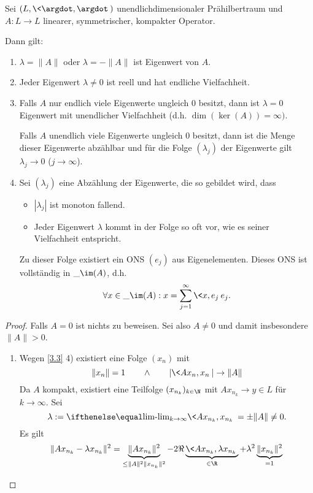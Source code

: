 \begin{st} \label{3.5}
	Sei $(L, \<\argdot,\argdot\>)$ unendlichdimensionaler Prähilbertraum und $A: L \to L$ linearer, symmetrischer, kompakter Operator.

	Dann gilt:
	\begin{enumerate}[1)]
		\item
			$\lambda = \|A \|$ oder $\lambda = - \|A\|$ ist Eigenwert von $A$.
		\item
			Jeder Eigenwert $\lambda \neq 0$ ist reell und hat endliche Vielfachheit.
		\item
			Falls $A$ nur endlich viele Eigenwerte ungleich $0$ besitzt, dann ist $\lambda = 0$ Eigenwert mit unendlicher Vielfachheit (d.h. $\dim (\ker (A)) = \infty)$.

			Falls $A$ unendlich viele Eigenwerte ungleich $0$ besitzt, dann ist die Menge dieser Eigenwerte abzählbar und für die Folge $(\lambda_j)$ der Eigenwerte gilt $\lambda_j \to 0$ ($j \to \infty$).
		\item
			Sei $(\lambda_j)$ eine Abzählung der Eigenwerte, die so gebildet wird, dass
			\begin{itemize}
				\item
					$|\lambda_j|$ ist monoton fallend.
				\item
					Jeder Eigenwert $\lambda$ kommt in der Folge so oft vor, wie es seiner Vielfachheit entspricht.
			\end{itemize}
			Zu dieser Folge existiert ein ONS $(e_j)$ aus Eigenelementen.
			Dieses ONS ist vollständig in $\_{\im (A)}$, d.h.
			\[
				\forall x \in \_{\im(A)} : x = \sum_{j=1}^\infty \<x,e_j\> e_j.
			\]
	\end{enumerate}
	\begin{proof}
		Falls $A = 0$ ist nichts zu beweisen.
		Sei also $A \neq 0$ und damit insbesondere $\|A\| > 0$.
		\begin{enumerate}[1)]
			\item
				Wegen \ref{3.3} 4) existiert eine Folge $(x_n)$ mit
				\[
					\|x_n\| = 1 \qquad \land \qquad |\<Ax_n,x_n\>| \to \|A\|
				\]
				Da $A$ kompakt, existiert eine Teilfolge $(x_{n_k})_{k\in \N}$ mit $Ax_{n_k} \to y \in L$ für $k \to \infty$.
				Sei 
				\[
					\lambda := \lim_{k\to\infty} \<Ax_{n_k},x_{n_k}\> = \pm \|A\| \neq 0.
				\]
				Es gilt
				\begin{align*}
					\|Ax_{n_k} - \lambda x_{n_k}\|^2
					&= \underbrace{\|Ax_{n_k} \|^2}_{\le \|A\|^2 \|x_{n_k}\|^2} - 2 \Re \underbrace{\< Ax_{n_k}, \lambda x_{n_k} \>}_{\in \R} + \lambda^2 \underbrace{\|x_{n_k}\|^2}_{=1} \\

\end{align*}
\end{enumerate}
\end{proof}
\end{st}
